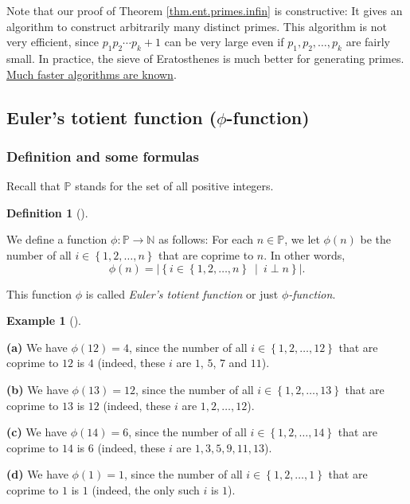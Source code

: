 \documentclass[numbers=enddot,12pt,final,onecolumn,notitlepage]{scrartcl}%
\numberwithin{exer}{subsection}
\theoremstyle{definition}
\newtheorem{defi}[theo]{Definition}
\newenvironment{definition}[1][]
{\begin{defi}[#1]\begin{leftbar}}
{\end{leftbar}\end{defi}}
\newtheorem{exam}[theo]{Example}
\newenvironment{example}[1][]
{\begin{exam}[#1]\begin{leftbar}}
{\end{leftbar}\end{exam}}
\begin{document}
Note that our proof of Theorem \ref{thm.ent.primes.infin} is constructive: It
gives an algorithm to construct arbitrarily many distinct primes. This
algorithm is not very efficient, since $p_{1}p_{2}\cdots p_{k}+1$ can be very
large even if $p_{1},p_{2},\ldots,p_{k}$ are fairly small. In practice, the
sieve of Eratosthenes is much better for generating primes.
\href{https://en.wikipedia.org/wiki/Generating_primes}{Much faster algorithms
are known}.

\subsection{Euler's totient function ($\phi$-function)}

\subsubsection{Definition and some formulas}

Recall that $\mathbb{P}$ stands for the set of all positive integers.

\begin{definition}
\label{def.ent.phi.phi}We define a function $\phi:\mathbb{P}\rightarrow
\mathbb{N}$ as follows: For each $n\in\mathbb{P}$, we let $\phi\left(
n\right)  $ be the number of all $i\in\left\{  1,2,\ldots,n\right\}  $ that
are coprime to $n$. In other words,%
\begin{equation}
\phi\left(  n\right)  =\left\vert \left\{  i\in\left\{  1,2,\ldots,n\right\}
\ \mid\ i\perp n\right\}  \right\vert . \label{eq.def.ent.phi.phi.1}%
\end{equation}


This function $\phi$ is called \textit{Euler's totient function} or just
$\phi$\textit{-function}.
\end{definition}

\begin{example}
\textbf{(a)} We have $\phi\left(  12\right)  =4$, since the number of all
$i\in\left\{  1,2,\ldots,12\right\}  $ that are coprime to $12$ is $4$
(indeed, these $i$ are $1$, $5$, $7$ and $11$).

\textbf{(b)} We have $\phi\left(  13\right)  =12$, since the number of all
$i\in\left\{  1,2,\ldots,13\right\}  $ that are coprime to $13$ is $12$
(indeed, these $i$ are $1,2,\ldots,12$).

\textbf{(c)} We have $\phi\left(  14\right)  =6$, since the number of all
$i\in\left\{  1,2,\ldots,14\right\}  $ that are coprime to $14$ is $6$
(indeed, these $i$ are $1,3,5,9,11,13$).

\textbf{(d)} We have $\phi\left(  1\right)  =1$, since the number of all
$i\in\left\{  1,2,\ldots,1\right\}  $ that are coprime to $1$ is $1$ (indeed,
the only such $i$ is $1$).
\end{example}
\end{document}
